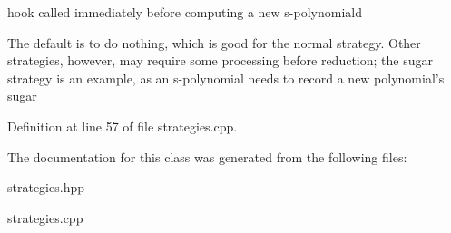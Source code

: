 hook called immediately before computing a new s-\/polynomiald 

The default is to do nothing, which is good for the normal strategy. Other strategies, however, may require some processing before reduction; the sugar strategy is an example, as an s-\/polynomial needs to record a new polynomial's sugar 

Definition at line 57 of file strategies.\+cpp.



The documentation for this class was generated from the following files\+:\begin{DoxyCompactItemize}
\item 
strategies.\+hpp\item 
strategies.\+cpp\end{DoxyCompactItemize}
